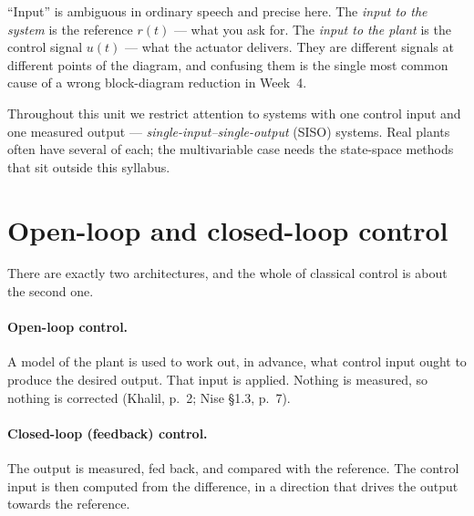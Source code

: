 \documentclass[11pt,a4paper]{article}
\begin{document}
\begin{pitfall}
``Input'' is ambiguous in ordinary speech and precise here. The \emph{input to
the system} is the reference $r(t)$ --- what you ask for. The \emph{input to the
plant} is the control signal $u(t)$ --- what the actuator delivers. They are
different signals at different points of the diagram, and confusing them is the
single most common cause of a wrong block-diagram reduction in Week~4.
\end{pitfall}

Throughout this unit we restrict attention to systems with one control input
and one measured output --- \emph{single-input--single-output} (SISO) systems.
Real plants often have several of each; the multivariable case needs the
state-space methods that sit outside this syllabus.

\section{Open-loop and closed-loop control}
\label{sec:oc}

There are exactly two architectures, and the whole of classical control is
about the second one.

\paragraph{Open-loop control.} A model of the plant is used to work out, in
advance, what control input ought to produce the desired output. That input is
applied. Nothing is measured, so nothing is corrected
(Khalil, p.~2; Nise \S1.3, p.~7).

\paragraph{Closed-loop (feedback) control.} The output is measured, fed back,
and compared with the reference. The control input is then computed from the
difference, in a direction that drives the output towards the reference.
\end{document}
